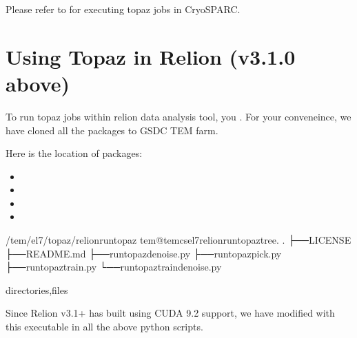 \documentclass[a4paper,10pt,english]{sphinxmanual}
\begin{document}
\sphinxAtStartPar
Please refer to  for executing topaz jobs in CryoSPARC.


\section{Using Topaz in Relion (v3.1.0 above)}
\label{\detokenize{topaz:using-topaz-in-relion-v3-1-0-above}}
\sphinxAtStartPar
To run topaz jobs within relion data analysis tool, you . For your conveneince, we have cloned all the  packages to GSDC TEM farm.

\sphinxAtStartPar
Here is the location of  packages:
\begin{itemize}
\item {} 
\sphinxAtStartPar
{}

\item {} 
\sphinxAtStartPar
{}

\item {} 
\sphinxAtStartPar
{}

\item {} 
\sphinxAtStartPar
{}

\end{itemize}

\begin{sphinxVerbatim}[commandchars=\\\{\}]
\PYGZdl{}\PYGZgt{}
/tem/el7/topaz/relion\PYGZus{}run\PYGZus{}topaz
\PYG{o}{[}tem@tem\PYGZhy{}cs\PYGZhy{}el7relion\PYGZus{}run\PYGZus{}topaz\PYG{o}{]}\PYGZdl{}tree.
.
├──LICENSE
├──README.md
├──run\PYGZus{}topaz\PYGZus{}denoise.py
├──run\PYGZus{}topaz\PYGZus{}pick.py
├──run\PYGZus{}topaz\PYGZus{}train.py
└──run\PYGZus{}topaz\PYGZus{}train\PYGZus{}denoise.py

directories,files
\end{sphinxVerbatim}

\sphinxAtStartPar
Since Relion v3.1+ has built using CUDA 9.2 support, we have modified  with this executable  in all the above python scripts.
\end{document}
